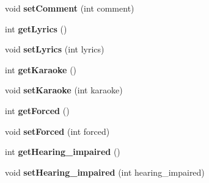 \begin{DoxyCompactItemize}
\item 
\hypertarget{classjson__objects_1_1_disposition_ac01e33b631ccbac3c3646348c2d208c3}{
void {\bfseries setComment} (int comment)}
\label{classjson__objects_1_1_disposition_ac01e33b631ccbac3c3646348c2d208c3}

\item 
\hypertarget{classjson__objects_1_1_disposition_a54b34b6fd416bbfa750f36f2eb65dc8e}{
int {\bfseries getLyrics} ()}
\label{classjson__objects_1_1_disposition_a54b34b6fd416bbfa750f36f2eb65dc8e}

\item 
\hypertarget{classjson__objects_1_1_disposition_a06bf955a72d30be320637ea2048e592b}{
void {\bfseries setLyrics} (int lyrics)}
\label{classjson__objects_1_1_disposition_a06bf955a72d30be320637ea2048e592b}

\item 
\hypertarget{classjson__objects_1_1_disposition_aa3a466b71a019a504fb0ab29c7d1e758}{
int {\bfseries getKaraoke} ()}
\label{classjson__objects_1_1_disposition_aa3a466b71a019a504fb0ab29c7d1e758}

\item 
\hypertarget{classjson__objects_1_1_disposition_ad515111e44780e5925d8ad377a353461}{
void {\bfseries setKaraoke} (int karaoke)}
\label{classjson__objects_1_1_disposition_ad515111e44780e5925d8ad377a353461}

\item 
\hypertarget{classjson__objects_1_1_disposition_a4b70d448734d2e7a14740c71c2d6dec8}{
int {\bfseries getForced} ()}
\label{classjson__objects_1_1_disposition_a4b70d448734d2e7a14740c71c2d6dec8}

\item 
\hypertarget{classjson__objects_1_1_disposition_ab98ef7d99d65d26818c07c0867d900dc}{
void {\bfseries setForced} (int forced)}
\label{classjson__objects_1_1_disposition_ab98ef7d99d65d26818c07c0867d900dc}

\item 
\hypertarget{classjson__objects_1_1_disposition_ad52aa5f0d489f8c5fd13a7a96a3e9e60}{
int {\bfseries getHearing\_\-impaired} ()}
\label{classjson__objects_1_1_disposition_ad52aa5f0d489f8c5fd13a7a96a3e9e60}

\item 
\hypertarget{classjson__objects_1_1_disposition_ab99c3c08e8998d584eef25d842854f2c}{
void {\bfseries setHearing\_\-impaired} (int hearing\_\-impaired)}
\label{classjson__objects_1_1_disposition_ab99c3c08e8998d584eef25d842854f2c}


\end{DoxyCompactItemize}
